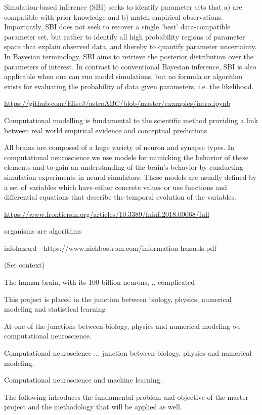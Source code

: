Simulation-based inference (SBI) seeks to identify parameter sets that a)
are compatible with prior knowledge and b) match empirical observations. Importantly,
SBI does not seek to recover a single ‘best’ data-compatible parameter set, but rather
to identify all high probability regions of parameter space that explain observed data,
and thereby to quantify parameter uncertainty. In Bayesian terminology, SBI aims to retrieve the posterior distribution over the parameters of interest. In contrast to conventional
Bayesian inference, SBI is also applicable when one can run model simulations, but no
formula or algorithm exists for evaluating the probability of data given parameters, i.e.
the likelihood.

\url{https://github.com/EliseJ/astroABC/blob/master/examples/intro.ipynb}

Computational modelling is fundamental to the scientific method providing a link between real world empirical evidence and conceptual predictions

All brains are composed of a huge variety of neuron and synapse types. In computational neuroscience we use models for mimicking the behavior of these elements and to gain an understanding of the brain's behavior by conducting simulation experiments in neural simulators. These models are usually defined by a set of variables which have either concrete values or use functions and differential equations that describe the temporal evolution of the variables.

\url{https://www.frontiersin.org/articles/10.3389/fninf.2018.00068/full}

organisms are algorithms

infohazard - https://www.nickbostrom.com/information-hazards.pdf

(Set context)

The human brain, with its 100 billion neurons, .. complicated 

This project is placed in the junction between biology, physics, numerical modeling and statistical learning 


At one of the junctions between biology, physics and numerical modeling we computational neuroscience. 

Computational neuroscience ... junction between biology, physics and numerical modeling. 

Computational neuroscience and machine learning. 

The following introduces the fundamental problem and objective of the master project and the methodology that will be applied as well.


